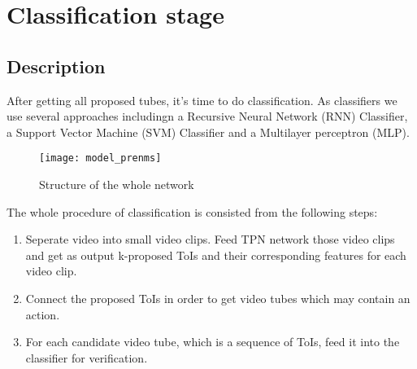 



% 

\chapter{Classification stage}
\section{Description}
After getting all proposed tubes, it's time to do classification. As classifiers we use several approaches includingn
a Recursive Neural Network (RNN) Classifier, a Support Vector Machine (SVM) Classifier and a Multilayer perceptron (MLP).

\begin{figure}[h]
  \centering
  \texttt{[image: model\_prenms]}
  \caption{Structure of the whole network}
  \label{fig:whole_network}
\end{figure}

The whole procedure of classification is consisted from the following steps:
\begin{enumerate}
\item Seperate video into small video clips. Feed TPN network those video clips and get as output
  k-proposed ToIs and their corresponding features for each video clip.
\item Connect the proposed ToIs in order to get video tubes which may contain an action.
\item For each candidate video tube, which is a sequence of ToIs, feed it into the classifier
  for verification.
\end{enumerate}

